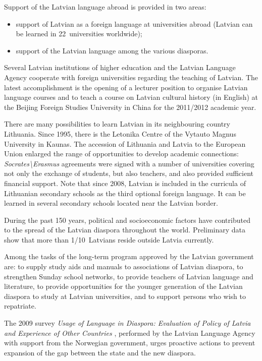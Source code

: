 \begin{multicols}{2}
Support of the Latvian language abroad is provided in two areas:

\begin{itemize}
\item  support of Latvian as a foreign language at universities abroad (Latvian can be learned in 22~universities worldwide);
\item  support of the Latvian language among the various diasporas.
\end{itemize}

Several Latvian institutions of higher education and the Latvian Language Agency cooperate with foreign universities regarding the teaching of Latvian.
The latest accomplishment is the opening of a lecturer position to organise Latvian language courses and to teach a course on Latvian cultural history (in English) at the Beijing Foreign Studies University in China for the 2011/2012 academic year.

There are many possibilities to learn Latvian in its neighbouring country Lithuania.
Since 1995, there is the Letonika Centre of the Vytauto Magnus University in Kaunas.
The accession of Lithuania and Latvia to the European Union enlarged the range of opportunities to develop academic connections: \textit{Socrates\textbackslash Erasmus} agreements were signed with a number of universities covering not only the exchange of students, but also teachers, and also provided sufficient financial support.
Note that since 2008, Latvian is included in the curricula of Lithuanian secondary schools as the third optional foreign language.
It can be learned in several secondary schools located near the Latvian border.

During the past 150 years, political and socioeconomic factors have contributed to the spread of the Latvian diaspora throughout the world.
Preliminary data show that more than 1/10~Latvians reside outside Latvia currently.

Among the tasks of the long-term program approved by the Latvian government are: to supply study aids and manuals to associations of Latvian diaspora, to strengthen Sunday school networks, to provide teachers of Latvian language and literature, to provide opportunities for the younger generation of the Latvian diaspora to study at Latvian universities, and to support persons who wish to repatriate.

The 2009 survey \textit{Usage of Language in Diaspora: Evaluation of Policy of Latvia and Experience of Other Countries} \cite{Meta4}, performed by the Latvian Language Agency with support from the Norwegian government, urges proactive actions to prevent expansion of the gap between the state and the new diaspora.


\end{multicols}
